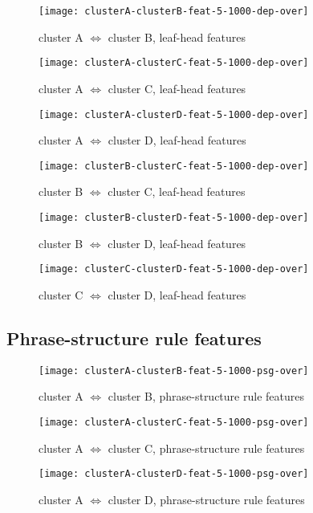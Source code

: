 \begin{figure}
  \texttt{[image: clusterA-clusterB-feat-5-1000-dep-over]}
  \caption{cluster A $\Leftrightarrow$ cluster B, leaf-head features}
  \label{clusterA-clusterB-feat-5-1000-dep-over}
\end{figure}
\begin{figure}
  \texttt{[image: clusterA-clusterC-feat-5-1000-dep-over]}
  \caption{cluster A $\Leftrightarrow$ cluster C, leaf-head features}
  \label{clusterA-clusterC-feat-5-1000-dep-over}
\end{figure}
\begin{figure}
  \texttt{[image: clusterA-clusterD-feat-5-1000-dep-over]}
  \caption{cluster A $\Leftrightarrow$ cluster D, leaf-head features}
  \label{clusterA-clusterD-feat-5-1000-dep-over}
\end{figure}
\begin{figure}
  \texttt{[image: clusterB-clusterC-feat-5-1000-dep-over]}
  \caption{cluster B $\Leftrightarrow$ cluster C, leaf-head features}
  \label{clusterB-clusterC-feat-5-1000-dep-over}
\end{figure}
\begin{figure}
  \texttt{[image: clusterB-clusterD-feat-5-1000-dep-over]}
  \caption{cluster B $\Leftrightarrow$ cluster D, leaf-head features}
  \label{clusterB-clusterD-feat-5-1000-dep-over}
\end{figure}
\begin{figure}
  \texttt{[image: clusterC-clusterD-feat-5-1000-dep-over]}
  \caption{cluster C $\Leftrightarrow$ cluster D, leaf-head features}
  \label{clusterC-clusterD-feat-5-1000-dep-over}
\end{figure}


\subsection{Phrase-structure rule features}
\label{feature-ranking-psg}

\begin{figure}
  \texttt{[image: clusterA-clusterB-feat-5-1000-psg-over]}
  \caption{cluster A $\Leftrightarrow$ cluster B, phrase-structure
    rule features}
  \label{clusterA-clusterB-feat-5-1000-psg-over2}
\end{figure}
\begin{figure}
  \texttt{[image: clusterA-clusterC-feat-5-1000-psg-over]}
  \caption{cluster A $\Leftrightarrow$ cluster C, phrase-structure rule features}
  \label{clusterA-clusterC-feat-5-1000-psg-over}
\end{figure}
\begin{figure}
  \texttt{[image: clusterA-clusterD-feat-5-1000-psg-over]}
  \caption{cluster A $\Leftrightarrow$ cluster D, phrase-structure rule features}
  \label{clusterA-clusterD-feat-5-1000-psg-over}
\end{figure}


